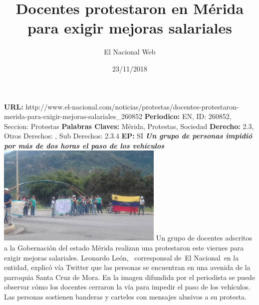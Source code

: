 \documentclass{article}%
\title{\textbf{Docentes protestaron en Mérida para exigir mejoras salariales}}%
\author{El Nacional Web}%
\date{23/11/2018}%
\begin{document}
%
\normalsize%
\maketitle%
\textbf{URL: }%
http://www.el{-}nacional.com/noticias/protestas/docentes{-}protestaron{-}merida{-}para{-}exigir{-}mejoras{-}salariales\_260852\newline%
%
\textbf{Periodico: }%
EN, %
ID: %
260852, %
Seccion: %
Protestas\newline%
%
\textbf{Palabras Claves: }%
Mérida, Protestas, Sociedad\newline%
%
\textbf{Derecho: }%
2.3, %
Otros Derechos: %
, %
Sub Derechos: %
2.3.4\newline%
%
\textbf{EP: }%
SI\newline%
\newline%
%
\textbf{\textit{Un grupo de personas impidió por más de dos horas el paso de los vehículos}}%
\newline%
\newline%
%
\includegraphics[width=300px]{144.jpg}%
\newline%
%
Un grupo de docentes adscritos a la Gobernación del estado Mérida realizan una protestaron este viernes para exigir mejoras salariales.%
\newline%
%
Leonardo León, ~corresponsal de~El Nacional~en la entidad, explicó vía Twitter que las personas se encuentran en una avenida de la parroquia Santa Cruz de Mora.%
\newline%
%
En la imagen difundida por el periodista se puede observar cómo los docentes cerraron la vía para impedir el paso de los vehículos. Las personas sostienen banderas y carteles con mensajes alusivos a su protesta.%
\newline%
%
\end{document}
